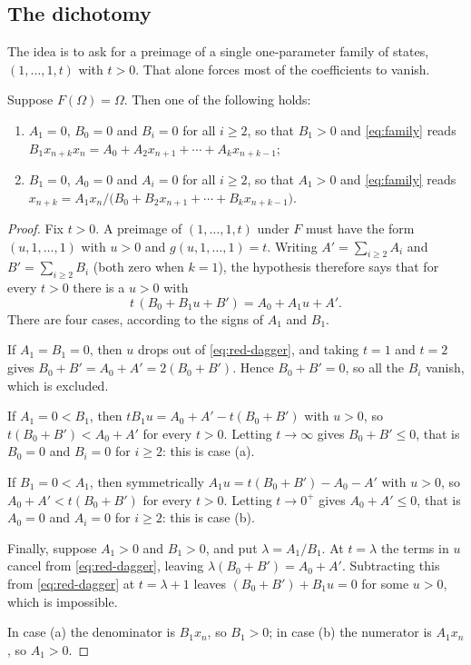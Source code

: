 \subsection{The dichotomy}

The idea is to ask for a preimage of a single one-parameter family of states,
$(1,\dots,1,t)$ with $t>0$. That alone forces most of the coefficients to
vanish.

\begin{theorem}[dichotomy]
\label{thm:red-dichotomy}
Suppose $F(\Omega)=\Omega$. Then one of the following holds:
\begin{enumerate}
\item[(a)] $A_1=0$, $B_0=0$ and $B_i=0$ for all $i\ge2$, so that $B_1>0$ and
\eqref{eq:family} reads
$B_1x_{n+k}x_n=A_0+A_2x_{n+1}+\cdots+A_kx_{n+k-1}$;
\item[(b)] $B_1=0$, $A_0=0$ and $A_i=0$ for all $i\ge2$, so that $A_1>0$ and
\eqref{eq:family} reads
$x_{n+k}=A_1x_n/\bigl(B_0+B_2x_{n+1}+\cdots+B_kx_{n+k-1}\bigr)$.
\end{enumerate}
\end{theorem}

\begin{proof}
Fix $t>0$. A preimage of $(1,\dots,1,t)$ under $F$ must have the form
$(u,1,\dots,1)$ with $u>0$ and $g(u,1,\dots,1)=t$. Writing
$A'=\sum_{i\ge2}A_i$ and $B'=\sum_{i\ge2}B_i$ (both zero when $k=1$), the
hypothesis therefore says that for every $t>0$ there is a $u>0$ with
\begin{equation}
t\,(B_0+B_1u+B')=A_0+A_1u+A'.
\label{eq:red-dagger}
\end{equation}
There are four cases, according to the signs of $A_1$ and $B_1$.

If $A_1=B_1=0$, then $u$ drops out of \eqref{eq:red-dagger}, and taking $t=1$
and $t=2$ gives $B_0+B'=A_0+A'=2(B_0+B')$. Hence $B_0+B'=0$, so all
the $B_i$ vanish, which is excluded.

If $A_1=0<B_1$, then $tB_1u=A_0+A'-t(B_0+B')$ with $u>0$, so
$t(B_0+B')<A_0+A'$ for every $t>0$. Letting $t\to\infty$ gives
$B_0+B'\le0$, that is $B_0=0$ and $B_i=0$ for $i\ge2$: this is case (a).

If $B_1=0<A_1$, then symmetrically $A_1u=t(B_0+B')-A_0-A'$ with $u>0$, so
$A_0+A'<t(B_0+B')$ for every $t>0$. Letting $t\to0^+$ gives $A_0+A'\le0$,
that is $A_0=0$ and $A_i=0$ for $i\ge2$: this is case (b).

Finally, suppose $A_1>0$ and $B_1>0$, and put $\lambda=A_1/B_1$. At $t=\lambda$
the terms in $u$ cancel from \eqref{eq:red-dagger}, leaving
$\lambda(B_0+B')=A_0+A'$. Subtracting this from \eqref{eq:red-dagger} at
$t=\lambda+1$ leaves $(B_0+B')+B_1u=0$ for some $u>0$, which is impossible.

In case (a) the denominator is $B_1x_n$, so $B_1>0$; in case (b) the numerator
is $A_1x_n$, so $A_1>0$.
\end{proof}

